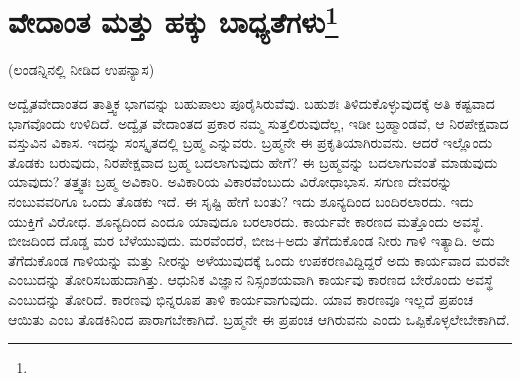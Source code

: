 
\chapter[ವೇದಾಂತ ಮತ್ತು ಹಕ್ಕು ಬಾಧ್ಯತೆಗಳು]{ವೇದಾಂತ ಮತ್ತು ಹಕ್ಕು ಬಾಧ್ಯತೆಗಳು\protect\footnote{}}

\begin{center}
(ಲಂಡನ್ನಿನಲ್ಲಿ ನೀಡಿದ ಉಪನ್ಯಾಸ)
\end{center}

ಅದ್ವೈತವೇದಾಂತದ ತಾತ್ತ್ವಿಕ ಭಾಗವನ್ನು ಬಹುಪಾಲು ಪೂರೈಸಿರುವೆವು. ಬಹುಶಃ ತಿಳಿದುಕೊಳ್ಳುವುದಕ್ಕೆ ಅತಿ ಕಷ್ಟವಾದ ಭಾಗವೊಂದು ಉಳಿದಿದೆ. ಅದ್ವೈತ ವೇದಾಂತದ ಪ್ರಕಾರ ನಮ್ಮ ಸುತ್ತಲಿರುವುದೆಲ್ಲ, ಇಡೀ ಬ್ರಹ್ಮಾಂಡವೆ, ಆ ನಿರಪೇಕ್ಷವಾದ ವಸ್ತುವಿನ ವಿಕಾಸ. ಇದನ್ನು ಸಂಸ್ಕೃತದಲ್ಲಿ ಬ್ರಹ್ಮ ಎನ್ನುವರು. ಬ್ರಹ್ಮನೇ ಈ ಪ್ರಕೃತಿಯಾಗಿರುವನು. ಆದರೆ ಇಲ್ಲೊಂದು ತೊಡಕು ಬರುವುದು, ನಿರಪೇಕ್ಷವಾದ ಬ್ರಹ್ಮ ಬದಲಾಗುವುದು ಹೇಗೆ? ಈ ಬ್ರಹ್ಮವನ್ನು ಬದಲಾಗುವಂತೆ ಮಾಡುವುದು ಯಾವುದು? ತತ್ತ್ವತಃ ಬ್ರಹ್ಮ ಅವಿಕಾರಿ. ಅವಿಕಾರಿಯ ವಿಕಾರವೆಂಬುದು ವಿರೋಧಾಭಾಸ. ಸಗುಣ ದೇವರನ್ನು ನಂಬುವವರಿಗೂ ಒಂದು ತೊಡಕು ಇದೆ. ಈ ಸೃಷ್ಟಿ ಹೇಗೆ ಬಂತು? ಇದು ಶೂನ್ಯದಿಂದ ಬಂದಿರಲಾರದು. ಇದು ಯುಕ್ತಿಗೆ ವಿರೋಧ. ಶೂನ್ಯದಿಂದ ಎಂದೂ ಯಾವುದೂ ಬರಲಾರದು. ಕಾರ್ಯವೇ ಕಾರಣದ ಮತ್ತೊಂದು ಅವಸ್ಥೆ. ಬೀಜದಿಂದ ದೊಡ್ಡ ಮರ ಬೆಳೆಯುವುದು. ಮರವೆಂದರೆ, ಬೀಜ+ಅದು ತೆಗೆದುಕೊಂಡ ನೀರು ಗಾಳಿ ಇತ್ಯಾದಿ. ಅದು ತೆಗೆದುಕೊಂಡ ಗಾಳಿಯನ್ನು ಮತ್ತು ನೀರನ್ನು ಅಳೆಯುವುದಕ್ಕೆ ಒಂದು ಉಪಕರಣವಿದ್ದಿದ್ದರೆ ಅದು ಕಾರ್ಯವಾದ ಮರವೇ ಎಂಬುದನ್ನು ತೋರಿಸಬಹುದಾಗಿತ್ತು. ಆಧುನಿಕ ವಿಜ್ಞಾನ ನಿಸ್ಸಂಶಯವಾಗಿ ಕಾರ್ಯವು ಕಾರಣದ ಬೇರೊಂದು ಅವಸ್ಥೆ ಎಂಬುದನ್ನು ತೋರಿದೆ. ಕಾರಣವು ಭಿನ್ನರೂಪ ತಾಳಿ ಕಾರ್ಯವಾಗುವುದು. ಯಾವ ಕಾರಣವೂ ಇಲ್ಲದೆ ಪ್ರಪಂಚ ಆಯಿತು ಎಂಬ ತೊಡಕಿನಿಂದ ಪಾರಾಗಬೇಕಾಗಿದೆ. ಬ್ರಹ್ಮನೇ ಈ ಪ್ರಪಂಚ ಆಗಿರುವನು ಎಂದು ಒಪ್ಪಿಕೊಳ್ಳಲೇಬೇಕಾಗಿದೆ.

